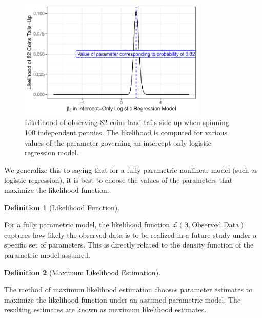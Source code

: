 \documentclass[
  letterpaper,
  DIV=11,
  numbers=noendperiod]{scrreprt}
\theoremstyle{definition}
\newtheorem{definition}{Definition}[chapter]
\theoremstyle{definition}
\theoremstyle{remark}
\begin{document}
\begin{figure}

{\centering \includegraphics[width=0.8\textwidth,height=\textheight]{./images/fig-nlm-coins-likelihood-1.pdf}

}

\caption{\label{fig-nlm-coins-likelihood}Likelihood of observing 82
coins land tails-side up when spinning 100 independent pennies. The
likelihood is computed for various values of the parameter governing an
intercept-only logistic regression model.}

\end{figure}

We generalize this to saying that for a fully parametric nonlinear model
(such as logistic regression), it is best to choose the values of the
parameters that maximize the likelihood function.

\begin{definition}[Likelihood
Function]\protect\hypertarget{def-likelihood-function}{}\label{def-likelihood-function}

For a fully parametric model, the likelihood function
\(\mathcal{L}(\boldsymbol{\beta}, \text{Observed Data})\) captures how
likely the observed data is to be realized in a future study under a
specific set of parameters. This is directly related to the density
function of the parametric model assumed.

\end{definition}

\begin{definition}[Maximum Likelihood
Estimation]\protect\hypertarget{def-mle}{}\label{def-mle}

The method of maximum likelihood estimation chooses parameter estimates
to maximize the likelihood function under an assumed parametric model.
The resulting estimates are known as maximum likelihood estimates.

\end{definition}
\end{document}
